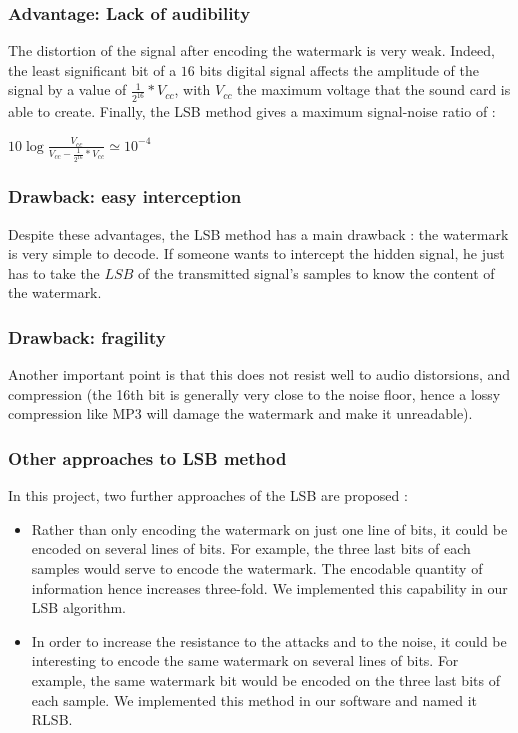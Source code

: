 \subsubsection{Advantage: Lack of audibility}
The distortion of the signal after encoding the watermark is very weak. Indeed, the least significant bit of a $16$ bits digital signal affects the amplitude of the signal by a value of $\displaystyle\frac{1}{2^{16}} * V_{cc}$\cite{kester2005data}, with $V_{cc}$ the maximum voltage that the sound card is able to create.
Finally, the LSB method gives a maximum signal-noise ratio of : 
 
\begin{center}
\begin{math}
10 \log \displaystyle\frac{V_{cc}}{V_{cc} - \displaystyle\frac{1}{2^{16}} * V_{cc}} \simeq 10^{-4}
\end{math}
\end{center}

\subsubsection{Drawback: easy interception}
Despite these advantages, the LSB method has a main drawback : the watermark is very simple to decode. If someone wants to intercept the hidden signal, he just has to take the $LSB$ of the transmitted signal's samples to know the content of the watermark.  

\subsubsection{Drawback: fragility}
Another important point is that this does not resist well to audio distorsions, and compression (the 16th bit is generally very close to the noise floor, hence a lossy compression like MP3 will damage the watermark and make it unreadable). 

\subsubsection{Other approaches to LSB method}
In this project, two further approaches of the \ac{LSB} are proposed :
\begin{itemize}
\item Rather than only encoding the watermark on just one line of bits, it could be encoded on several lines of bits. For example, the three last bits of each samples would serve to encode the watermark. The encodable quantity of information hence increases three-fold. We implemented this capability in our \ac{LSB} algorithm.
\item In order to increase the resistance to the attacks and to the noise, it could be interesting to encode the same watermark on several lines of bits. For example, the same watermark bit would be encoded on the three last bits of each sample. We implemented this method in our software and named it \ac{RLSB}.
\end{itemize} 

